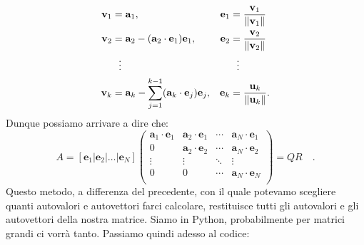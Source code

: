 \documentclass[10pt,a4paper]{article}
\begin{document}
\begin{align*}
\textbf{v}_1 & = \textbf{a}_1, & \textbf{e}_1 & = \frac{\mathbf{v}_1}{\|\mathbf{v}_1\|} \\
\mathbf{v}_2 & = \mathbf{a}_2 - (\mathbf{a}_2 \cdot \textbf{e}_1) \textbf{e}_1,
& \mathbf{e}_2 & = \frac{\mathbf{v}_2}{\|\mathbf{v}_2\|} \\
& {}\ \  \vdots & & {}\ \  \vdots \\
\mathbf{v}_k & = \mathbf{a}_k-\sum_{j=1}^{k-1} (\mathbf{a}_{k} \cdot \textbf{e}_j) \textbf{e}_j, & \mathbf{e}_k & = {\mathbf{u}_k\over \|\mathbf{u}_k \|}.
\end{align*}
Dunque possiamo arrivare a dire che:
\begin{equation}
A = [\textbf{e}_1 | \textbf{e}_2 | \hdots | \textbf{e}_N]
\begin{pmatrix}
\mathbf{a}_1 \cdot \textbf{e}_1 & \mathbf{a}_2 \cdot \textbf{e}_1 & \cdots & \mathbf{a}_N \cdot \textbf{e}_1 \\
0  & \mathbf{a}_2 \cdot \textbf{e}_2 & \cdots & \mathbf{a}_N \cdot \textbf{e}_2\\
\vdots & \vdots & \ddots & \vdots \\
0 & 0 & \cdots & \mathbf{a}_N \cdot \textbf{e}_N \\
\end{pmatrix}
= Q R \quad.
\end{equation}
Questo metodo, a differenza del precedente, con il quale potevamo scegliere quanti autovalori e autovettori farci calcolare, restituisce tutti gli autovalori e gli autovettori della nostra matrice. Siamo in Python, probabilmente per matrici grandi ci vorrà tanto.
Passiamo quindi adesso al codice:
\end{document}
